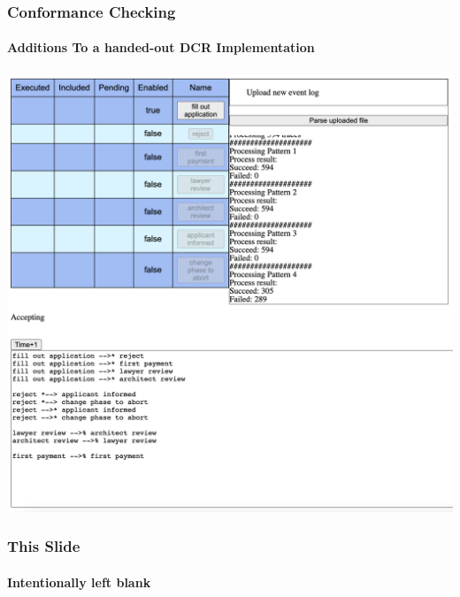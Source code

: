 \documentclass{beamer}
\begin{document}
    \begin{frame}[t]
        \frametitle{Conformance Checking}
        \framesubtitle{Additions To a handed-out DCR Implementation}
        \includegraphics[width=\linewidth]{images/conformance.png}
    \end{frame}
    \begin{frame}[t]
        \frametitle{This Slide}
        \framesubtitle{Intentionally left blank}
    \end{frame}

\end{document}
